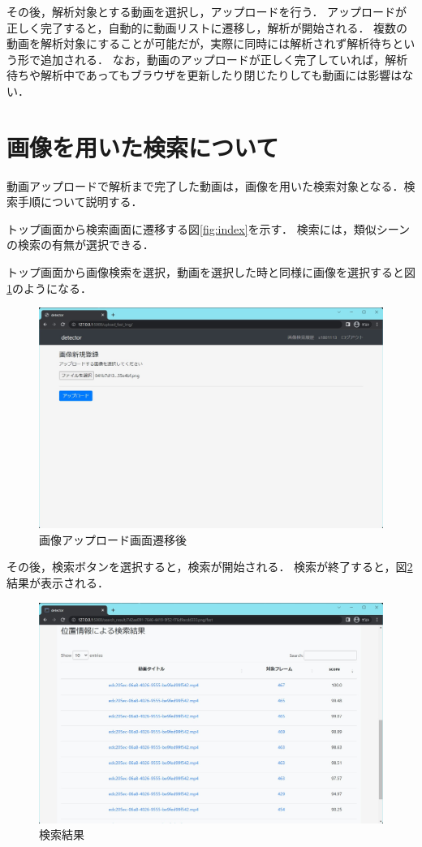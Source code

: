 \documentclass[a4j,12pt,dvipdfmx]{jreport}
\begin{document}
その後，解析対象とする動画を選択し，アップロードを行う．
アップロードが正しく完了すると，自動的に動画リストに遷移し，解析が開始される．
複数の動画を解析対象にすることが可能だが，実際に同時には解析されず解析待ちという形で追加される．
なお，動画のアップロードが正しく完了していれば，解析待ちや解析中であってもブラウザを更新したり閉じたりしても動画には影響はない．

\section{画像を用いた検索について}
動画アップロードで解析まで完了した動画は，画像を用いた検索対象となる．検索手順について説明する．

トップ画面から検索画面に遷移する図\ref{fig:index}を示す．
検索には，類似シーンの検索の有無が選択できる．

トップ画面から画像検索を選択，動画を選択した時と同様に画像を選択すると図\ref{fig:image_upload}のようになる．

\begin{figure}[b]
  \centering
  \includegraphics[width=13cm]{image/image_upload.jpg}
  \caption{画像アップロード画面遷移後}
  \label{fig:image_upload}
\end{figure}


その後，検索ボタンを選択すると，検索が開始される．
検索が終了すると，図\ref{fig:search_result}結果が表示される．

\begin{figure}[b]
  \centering
  \includegraphics[width=13cm]{image/search_result.jpg}
  \caption{検索結果}
  \label{fig:search_result}
\end{figure}
\end{document}
